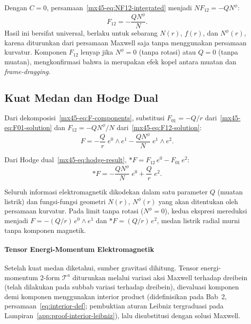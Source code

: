 Dengan $C = 0$, persamaan~\eqref{mx45-eq:NF12-integrated} menjadi $NF_{12} = -QN^\phi$:
\begin{equation}
    F_{12} = -\frac{QN^\phi}{N}. \label{mx45-eq:F12-solution}
\end{equation}
Hasil ini bersifat universal, berlaku untuk sebarang $N(r)$, $f(r)$, dan $N^\phi(r)$, karena diturunkan dari persamaan Maxwell saja tanpa menggunakan persamaan kurvatur. Komponen $F_{12}$ lenyap jika $N^\phi = 0$ (tanpa rotasi) atau $Q = 0$ (tanpa muatan), mengkonfirmasi bahwa ia merupakan efek kopel antara muatan dan \emph{frame-dragging}.

\subsection{Kuat Medan dan Hodge Dual}

Dari dekomposisi~\eqref{mx45-eq:F-components}, substitusi $F_{01} = -Q/r$ dari~\eqref{mx45-eq:F01-solution} dan $F_{12} = -QN^\phi/N$ dari~\eqref{mx45-eq:F12-solution}:
\begin{equation}
    F = -\frac{Q}{r}\;e^0 \wedge e^1
    - \frac{QN^\phi}{N}\;e^1 \wedge e^2. \label{mx45-eq:F-final}
\end{equation}

Dari Hodge dual~\eqref{mx45-eq:hodge-result}, ${*F} = F_{12}\,e^0 - F_{01}\,e^2$:
\begin{equation}
    *F = -\frac{QN^\phi}{N}\;e^0 + \frac{Q}{r}\;e^2. \label{mx45-eq:hodge-final}
\end{equation}

Seluruh informasi elektromagnetik dikodekan dalam satu parameter $Q$ (muatan listrik) dan fungsi-fungsi geometri $N(r)$, $N^\phi(r)$ yang akan ditentukan oleh persamaan kurvatur. Pada limit tanpa rotasi ($N^\phi = 0$), kedua ekspresi mereduksi menjadi $F = -(Q/r)\,e^0 \wedge e^1$ dan ${*F} = (Q/r)\,e^2$, medan listrik radial murni tanpa komponen magnetik.


\paragraph{Tensor Energi-Momentum Elektromagnetik}
\label{sec:b4-emtensor}

\noindent

Setelah kuat medan diketahui, sumber gravitasi dihitung. Tensor energi-momentum 2-form $\mathcal{T}^a$ diturunkan melalui variasi aksi Maxwell terhadap dreibein (telah dilakukan pada subbab variasi terhadap dreibein), dievaluasi komponen demi komponen menggunakan interior product (didefinisikan pada Bab~2, persamaan~\eqref{eq:interior-def}; pembuktian aturan Leibniz tergraduasi pada Lampiran~\ref{app:proof-interior-leibniz}), lalu disubstitusi dengan solusi Maxwell.

